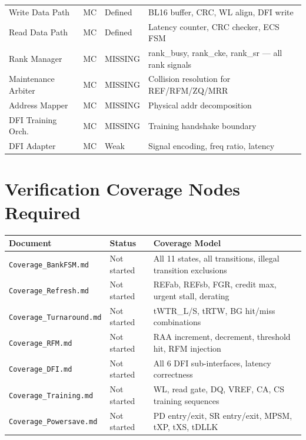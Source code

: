 \documentclass[10pt,a4paper]{article}
\newcommand{\Th}[1]{\cellcolor{thbg}\textbf{\small\color{acc1}#1}}
\newcommand{\RA}{\rowcolor{white}}
\newcommand{\RB}{\rowcolor{altbg}}
\begin{document}
\begin{center}
\begin{tabularx}{\linewidth}{@{} l l l X @{}}
\RB Write Data Path      & MC  & Defined & BL16 buffer, CRC, WL align, DFI write \\
\RA Read Data Path       & MC  & Defined & Latency counter, CRC checker, ECS FSM \\
\RB \textcolor{critbdr}{Rank Manager}        & MC & \textcolor{critbdr}{MISSING} & rank\_busy, rank\_cke, rank\_sr --- all rank signals \\
\RA \textcolor{critbdr}{Maintenance Arbiter} & MC & \textcolor{critbdr}{MISSING} & Collision resolution for REF/RFM/ZQ/MRR \\
\RB \textcolor{critbdr}{Address Mapper}      & MC & \textcolor{critbdr}{MISSING} & Physical addr decomposition \\
\RA \textcolor{critbdr}{DFI Training Orch.}  & MC & \textcolor{critbdr}{MISSING} & Training handshake boundary \\
\RB \textcolor{critbdr}{DFI Adapter}         & MC & \textcolor{critbdr}{Weak}    & Signal encoding, freq ratio, latency \\
\bottomrule
\end{tabularx}
\end{center}

\section{Verification Coverage Nodes Required}

\begin{center}
\begin{tabularx}{\linewidth}{@{} l l X @{}}
\toprule
\Th{Document} & \Th{Status} & \Th{Coverage Model} \\
\midrule
\RA \texttt{Coverage\_BankFSM.md}     & Not started & All 11 states, all transitions, illegal transition exclusions \\
\RB \texttt{Coverage\_Refresh.md}     & Not started & REFab, REFsb, FGR, credit max, urgent stall, derating \\
\RA \texttt{Coverage\_Turnaround.md}  & Not started & tWTR\_L/S, tRTW, BG hit/miss combinations \\
\RB \texttt{Coverage\_RFM.md}         & Not started & RAA increment, decrement, threshold hit, RFM injection \\
\RA \texttt{Coverage\_DFI.md}         & Not started & All 6 DFI sub-interfaces, latency correctness \\
\RB \texttt{Coverage\_Training.md}    & Not started & WL, read gate, DQ, VREF, CA, CS training sequences \\
\RA \texttt{Coverage\_Powersave.md}   & Not started & PD entry/exit, SR entry/exit, MPSM, tXP, tXS, tDLLK \\
\bottomrule
\end{tabularx}
\end{center}
\end{document}
